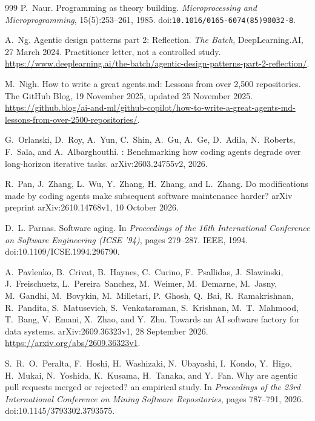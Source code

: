 \documentclass[11pt,a4paper]{article}
\begin{document}
\begin{thebibliography}{999}
P.~Naur.
\newblock Programming as theory building.
\newblock \emph{Microprocessing and Microprogramming}, 15(5):253--261, 1985.
\newblock doi:\nolinkurl{10.1016/0165-6074(85)90032-8}.

A.~Ng.
\newblock Agentic design patterns part 2: Reflection.
\newblock \emph{The Batch}, DeepLearning.AI, 27 March 2024.
Practitioner letter, not a controlled study.
\newblock \url{https://www.deeplearning.ai/the-batch/agentic-design-patterns-part-2-reflection/}.

M.~Nigh.
\newblock How to write a great {agents.md}: Lessons from over 2,500 repositories.
\newblock The GitHub Blog, 19 November 2025, updated 25 November 2025.
\newblock \url{https://github.blog/ai-and-ml/github-copilot/how-to-write-a-great-agents-md-lessons-from-over-2500-repositories/}.

G.~Orlanski, D.~Roy, A.~Yun, C.~Shin, A.~Gu, A.~Ge, D.~Adila, N.~Roberts,
F.~Sala, and A.~Albarghouthi.
: Benchmarking how coding agents degrade over
long-horizon iterative tasks.
\newblock arXiv:2603.24755v2, 2026.

R.~Pan, J.~Zhang, L.~Wu, Y.~Zhang, H.~Zhang, and L.~Zhang.
\newblock Do modifications made by coding agents make subsequent software
maintenance harder?
\newblock arXiv preprint arXiv:2610.14768v1, 10 October 2026.

D.~L. Parnas.
\newblock Software aging.
\newblock In \emph{Proceedings of the 16th International Conference on Software
Engineering (ICSE '94)}, pages 279--287. IEEE, 1994.
\newblock doi:10.1109/ICSE.1994.296790.

A.~Pavlenko, B.~Crivat, B.~Haynes, C.~Curino, F.~Psallidas, J.~Slawinski,
J.~Freischuetz, L.~Pereira~Sanchez, M.~Weimer, M.~Demarne, M.~Jasny,
M.~Gandhi, M.~Bovykin, M.~Milletari, P.~Ghosh, Q.~Bai, R.~Ramakrishnan,
R.~Pandita, S.~Matusevich, S.~Venkataraman, S.~Krishnan, M.~T.~Mahmood,
T.~Bang, V.~Emani, X.~Zhao, and Y.~Zhu.
\newblock Towards an {AI} software factory for data systems.
\newblock arXiv:2609.36323v1, 28 September 2026.
\newblock \url{https://arxiv.org/abs/2609.36323v1}.

S.~R.~O.~Peralta, F.~Hoshi, H.~Washizaki, N.~Ubayashi,
I.~Kondo, Y.~Higo, H.~Mukai, N.~Yoshida, K.~Kusama,
H.~Tanaka, and Y.~Fan.
\newblock Why are agentic pull requests merged or rejected? an empirical study.
\newblock In \emph{Proceedings of the 23rd International Conference on Mining
  Software Repositories}, pages 787--791, 2026.
\newblock doi:10.1145/3793302.3793575.


\end{thebibliography}
\end{document}
